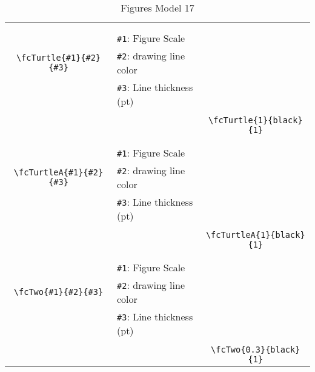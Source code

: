 \documentclass{article}
\begin{document}
\begin{table}[H]
\begin{tabular}{|c|l|c|}
	&&\multirow{5}{*}{\fcTurtle{1}{black}{1}}\\	&&\\	&\verb|#1|: Figure Scale &\\	\verb|\fcTurtle{#1}{#2}{#3}|&	\verb|#2|: drawing line color &\\	&\verb|#3|: Line thickness (pt) &\\ &&\\&&	\verb|\fcTurtle{1}{black}{1}|\\\hline 	
	&&\multirow{5}{*}{\fcTurtleA{1}{black}{1}}\\	&&\\	&\verb|#1|: Figure Scale &\\	\verb|\fcTurtleA{#1}{#2}{#3}|&	\verb|#2|: drawing line color &\\	&\verb|#3|: Line thickness (pt) &\\ &&\\&&	\verb|\fcTurtleA{1}{black}{1}|\\\hline 	
	&&\multirow{5}{*}{\fcTwo{0.3}{black}{1}}\\	&&\\	&\verb|#1|: Figure Scale &\\	\verb|\fcTwo{#1}{#2}{#3}|&	\verb|#2|: drawing line color &\\	&\verb|#3|: Line thickness (pt) &\\ &&\\&&	\verb|\fcTwo{0.3}{black}{1}|\\\hline 	\hline\end{tabular}\caption{Figures Model 17}\label{tab17}\end{table}
\end{document}
